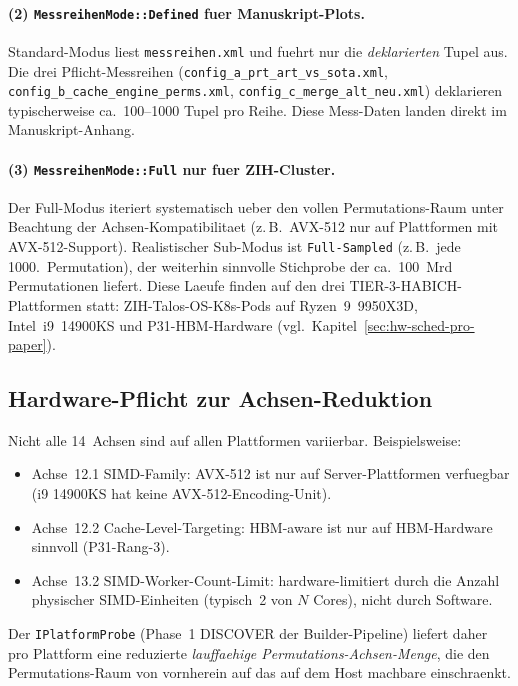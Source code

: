 \paragraph{(2) \texttt{MessreihenMode::Defined} fuer Manuskript-Plots.}
Standard-Modus liest \texttt{messreihen.xml} und fuehrt nur die
\emph{deklarierten} Tupel aus. Die drei Pflicht-Messreihen
(\texttt{config\_a\_prt\_art\_vs\_sota.xml},
\texttt{config\_b\_cache\_engine\_perms.xml},
\texttt{config\_c\_merge\_alt\_neu.xml}) deklarieren typischerweise
ca.~100--1000 Tupel pro Reihe. Diese Mess-Daten landen direkt im
Manuskript-Anhang.

\paragraph{(3) \texttt{MessreihenMode::Full} nur fuer ZIH-Cluster.}
Der Full-Modus iteriert systematisch ueber den vollen Permutations-Raum
unter Beachtung der Achsen-Kompatibilitaet (z.\,B.\ AVX-512 nur auf
Plattformen mit AVX-512-Support). Realistischer Sub-Modus ist
\texttt{Full-Sampled} (z.\,B.\ jede 1000.\ Permutation), der weiterhin
sinnvolle Stichprobe der ca.~100~Mrd Permutationen liefert. Diese
Laeufe finden auf den drei TIER-3-HABICH-Plattformen statt:
ZIH-Talos-OS-K8s-Pods auf Ryzen~9~9950X3D, Intel~i9~14900KS und
P31-HBM-Hardware (vgl.\ Kapitel~\ref{sec:hw-sched-pro-paper}).

\subsection{Hardware-Pflicht zur Achsen-Reduktion}

Nicht alle 14~Achsen sind auf allen Plattformen variierbar. Beispielsweise:

\begin{itemize}
    \item Achse~12.1 SIMD-Family: AVX-512 ist nur auf
    Server-Plattformen verfuegbar (i9 14900KS hat keine
    AVX-512-Encoding-Unit).
    \item Achse~12.2 Cache-Level-Targeting: HBM-aware ist nur auf
    HBM-Hardware sinnvoll (P31-Rang-3).
    \item Achse~13.2 SIMD-Worker-Count-Limit: hardware-limitiert
    durch die Anzahl physischer SIMD-Einheiten (typisch~2 von $N$
    Cores), nicht durch Software.
\end{itemize}

Der \texttt{IPlatformProbe} (Phase~1 DISCOVER der Builder-Pipeline)
liefert daher pro Plattform eine reduzierte \emph{lauffaehige
Permutations-Achsen-Menge}, die den Permutations-Raum von vornherein
auf das auf dem Host machbare einschraenkt.
